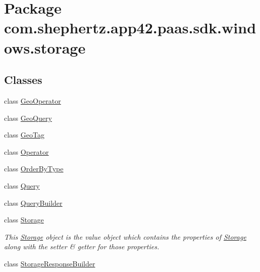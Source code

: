 \hypertarget{namespacecom_1_1shephertz_1_1app42_1_1paas_1_1sdk_1_1windows_1_1storage}{\section{Package com.\+shephertz.\+app42.\+paas.\+sdk.\+windows.\+storage}
\label{namespacecom_1_1shephertz_1_1app42_1_1paas_1_1sdk_1_1windows_1_1storage}
}
\subsection*{Classes}
\begin{DoxyCompactItemize}
\item 
class \hyperlink{classcom_1_1shephertz_1_1app42_1_1paas_1_1sdk_1_1windows_1_1storage_1_1_geo_operator}{Geo\+Operator}
\item 
class \hyperlink{classcom_1_1shephertz_1_1app42_1_1paas_1_1sdk_1_1windows_1_1storage_1_1_geo_query}{Geo\+Query}
\item 
class \hyperlink{classcom_1_1shephertz_1_1app42_1_1paas_1_1sdk_1_1windows_1_1storage_1_1_geo_tag}{Geo\+Tag}
\item 
class \hyperlink{classcom_1_1shephertz_1_1app42_1_1paas_1_1sdk_1_1windows_1_1storage_1_1_operator}{Operator}
\item 
class \hyperlink{classcom_1_1shephertz_1_1app42_1_1paas_1_1sdk_1_1windows_1_1storage_1_1_order_by_type}{Order\+By\+Type}
\item 
class \hyperlink{classcom_1_1shephertz_1_1app42_1_1paas_1_1sdk_1_1windows_1_1storage_1_1_query}{Query}
\item 
class \hyperlink{classcom_1_1shephertz_1_1app42_1_1paas_1_1sdk_1_1windows_1_1storage_1_1_query_builder}{Query\+Builder}
\item 
class \hyperlink{classcom_1_1shephertz_1_1app42_1_1paas_1_1sdk_1_1windows_1_1storage_1_1_storage}{Storage}
\begin{DoxyCompactList}\small\item\em This \hyperlink{classcom_1_1shephertz_1_1app42_1_1paas_1_1sdk_1_1windows_1_1storage_1_1_storage}{Storage} object is the value object which contains the properties of \hyperlink{classcom_1_1shephertz_1_1app42_1_1paas_1_1sdk_1_1windows_1_1storage_1_1_storage}{Storage} along with the setter \& getter for those properties. \end{DoxyCompactList}\item 
class \hyperlink{classcom_1_1shephertz_1_1app42_1_1paas_1_1sdk_1_1windows_1_1storage_1_1_storage_response_builder}{Storage\+Response\+Builder}

\end{DoxyCompactItemize}
